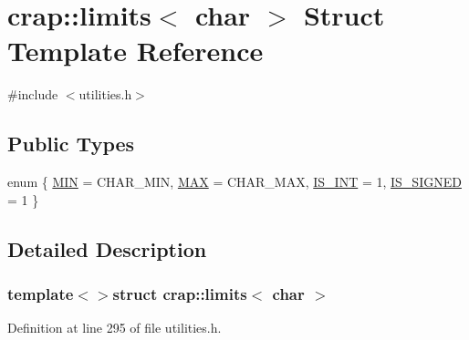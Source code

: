 \hypertarget{structcrap_1_1limits_3_01char_01_4}{\section{crap\+:\+:limits$<$ char $>$ Struct Template Reference}
\label{structcrap_1_1limits_3_01char_01_4}
}


{\ttfamily \#include $<$utilities.\+h$>$}

\subsection*{Public Types}
\begin{DoxyCompactItemize}
\item 
enum \{ \hyperlink{structcrap_1_1limits_3_01char_01_4_ac4e414f38522055fb85f898b32554f48a6f881f6c22400e8345d0ddb03e97b986}{M\+I\+N} = C\+H\+A\+R\+\_\+\+M\+I\+N, 
\hyperlink{structcrap_1_1limits_3_01char_01_4_ac4e414f38522055fb85f898b32554f48acf7c4799d0f0d9ac15715d2a006d92d3}{M\+A\+X} = C\+H\+A\+R\+\_\+\+M\+A\+X, 
\hyperlink{structcrap_1_1limits_3_01char_01_4_ac4e414f38522055fb85f898b32554f48afeb7edc497fa8bc9ba26ff3f0c0083b1}{I\+S\+\_\+\+I\+N\+T} = 1, 
\hyperlink{structcrap_1_1limits_3_01char_01_4_ac4e414f38522055fb85f898b32554f48a8a3133501bca3b7b3bade69e4af680cc}{I\+S\+\_\+\+S\+I\+G\+N\+E\+D} = 1
 \}
\end{DoxyCompactItemize}


\subsection{Detailed Description}
\subsubsection*{template$<$$>$struct crap\+::limits$<$ char $>$}



Definition at line 295 of file utilities.\+h.



